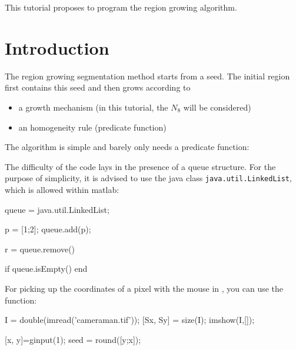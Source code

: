 \def\difficulty{1}
\begin{note}This tutorial proposes to program the region growing algorithm.\end{note}
\label{tutorial:regiongrowing}

\vspace*{-10pt}
\section{Introduction}
The region growing segmentation method starts from a seed. The initial region first contains this seed and then grows according to 
\begin{itemize}
 \item a growth mechanism (in this tutorial, the $N_8$ will be considered)
 \item an homogeneity rule (predicate function)
\end{itemize}

The algorithm is simple and barely only needs a predicate function:

\begin{algorithm}[H]
    \caption{}
  \end{algorithm}%

  \begin{mcomment}
    
The difficulty of the code lays in the presence of a queue structure. For the purpose of simplicity, it is advised to use the java class \lstinline!java.util.LinkedList!, which is allowed within matlab:
\begin{matlab}
queue = java.util.LinkedList;

p = [1;2];
queue.add(p);

r = queue.remove()

if queue.isEmpty()
end
\end{matlab}

For picking up the coordinates of a pixel with the mouse in \matlabregistered{}, you can use the  function:
\begin{matlab}
I = double(imread('cameraman.tif'));
[Sx, Sy] = size(I);
imshow(I,[]);

[x, y]=ginput(1);
seed = round([y;x]); %
\end{matlab}
\end{mcomment}

